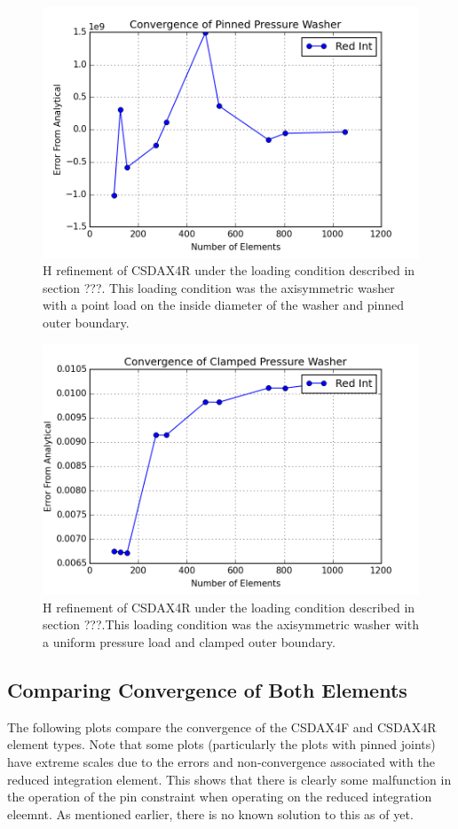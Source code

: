 \documentclass[10pt,letterpaper]{report}
\numberwithin{equation}{chapter}
\begin{document}
\begin{figure}[H]
\centering
\includegraphics[width=0.7\linewidth]{./GoodImages/Conv_WaPoPi_3}
\caption[H refinement of CSDAX4R]{H refinement of CSDAX4R under the loading condition described in section ???. This loading condition was the axisymmetric washer with a point load on the inside diameter of the washer and pinned outer boundary.}
\label{fig:Conv_PlPoCl_3}
\end{figure}

\begin{figure}[H]
\centering
\includegraphics[width=0.7\linewidth]{./GoodImages/Conv_WaPrCl_3}
\caption[H refinement of CSDAX4R]{H refinement of CSDAX4R under the loading condition described in section ???.This loading condition was the axisymmetric washer with a uniform pressure load and clamped outer boundary.}
\label{fig:Conv_PlPoCl_3}
\end{figure}

\subsection{Comparing Convergence of Both Elements}
The following plots compare the convergence of the CSDAX4F and CSDAX4R element types. Note that some plots (particularly the plots with pinned joints) have extreme scales due to the errors and non-convergence associated with the reduced integration element. This shows that there is clearly some malfunction in the operation of the pin constraint when operating on the reduced integration eleemnt. As mentioned earlier, there is no known solution to this as of yet.
\end{document}
